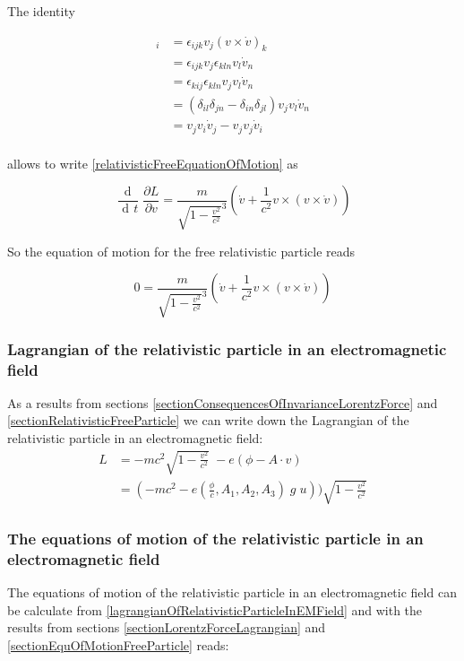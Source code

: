 \documentclass{article}
\DeclareMathOperator{\dd}{d\!}
\begin{document}
The identity


\begin{align}
    [ v \times (v \times \dot{v})]_i &= \epsilon _{ijk} v_j (v \times \dot{v})_k \nonumber \\
    &= \epsilon _{ijk} v_j \epsilon _{kln} v_l \dot{v}_n \nonumber \\
    &= \epsilon_{kij} \epsilon _{kln}  v_j v_l \dot{v}_n \nonumber \\
    &= (\delta_{il} \delta_{jn} - \delta_{in} \delta_{jl})  v_j v_l \dot{v}_n \nonumber \\
    &= v_j v_i \dot{v}_j - v_j v_j \dot{v}_i \nonumber \\
\end{align}

allows to write \ref{relativisticFreeEquationOfMotion} as

\begin{equation}
    \frac{\dd}{\dd t} \frac{\partial L}{\partial v} = \frac{m}{\sqrt{1 - \frac{v^2}{c^2}}^3} (\dot{v} + \frac{1}{c^2} v \times (v \times \dot{v}))
\end{equation}

So the equation of motion for the free relativistic particle reads

\begin{equation}
    0 = \frac{m}{\sqrt{1 - \frac{v^2}{c^2}}^3} (\dot{v} + \frac{1}{c^2} v \times (v \times \dot{v}))
\end{equation}

\subsubsection{Lagrangian of the relativistic particle in an electromagnetic field}

As a results from sections \ref{sectionConsequencesOfInvarianceLorentzForce} and \ref{sectionRelativisticFreeParticle} we can write down the Lagrangian of the relativistic particle in an electromagnetic field:
\begin{align} \label{lagrangianOfRelativisticParticleInEMField}
L &= -mc^2 \sqrt{1-\frac{v^2}{c^2}} \; - e (\phi - A \cdot v) \nonumber \\
&= ( -mc^2 - e (\frac{\phi}{c} , A_1, A_2, A_3) \; g \; u)) \sqrt{1-\frac{v^2}{c^2}}
\end{align}


\subsubsection{The equations of motion of the relativistic particle in an electromagnetic field}
The equations of motion of the relativistic particle in an electromagnetic field
can be calculate from \ref{lagrangianOfRelativisticParticleInEMField} and with the results from sections \ref{sectionLorentzForceLagrangian} and \ref{sectionEquOfMotionFreeParticle} reads:
\end{document}

